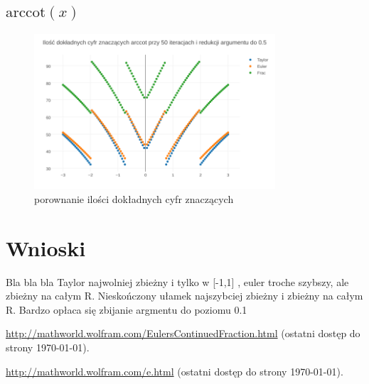 \documentclass{article}
\begin{document}
\subsection{$\textrm{arccot}(x)$}
	\FloatBarrier
	\begin{figure}[h]
		\includegraphics[width=0.8\textwidth,scale=0.5]{acot_znaczace.png}
		\caption{porownanie ilości dokładnych cyfr znaczących}
		\label{wskaźnik uwarunkowania}
	\end{figure}

	
\section{Wnioski}
Bla bla bla Taylor najwolniej zbieżny i tylko w [-1,1]
, euler troche szybszy, ale zbieżny na całym R.
Nieskończony ułamek najszybciej zbieżny i zbieżny na całym R.
Bardzo opłaca się zbijanie argmentu do poziomu 0.1


\begin{thebibliography}{9}
	\itemsep2pt
	 \url{http://mathworld.wolfram.com/EulersContinuedFraction.html}
	(ostatni dostęp do strony \today).
	
	 \url{http://mathworld.wolfram.com/e.html}
	(ostatni dostęp do strony \today).
	
\end{thebibliography}
\end{document}
